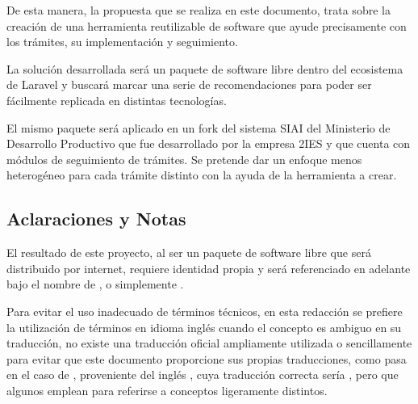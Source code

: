De esta manera, la propuesta que se realiza en este documento, trata sobre la creación de una herramienta reutilizable de software que ayude precisamente con los trámites, su implementación y seguimiento.

La solución desarrollada será un paquete de software libre dentro del ecosistema de Laravel y buscará marcar una serie de recomendaciones para poder ser fácilmente replicada en distintas tecnologías.

El mismo paquete será aplicado en un fork del sistema SIAI del Ministerio de Desarrollo Productivo que fue desarrollado por la empresa 2IES y que cuenta con módulos de seguimiento de trámites. Se pretende dar un enfoque menos heterogéneo para cada trámite distinto con la ayuda de la herramienta a crear.

\subsection{Aclaraciones y Notas}
El resultado de este proyecto, al ser un paquete de software libre que será distribuido por internet, requiere identidad propia y será referenciado en adelante bajo el nombre de , o simplemente .

Para evitar el uso inadecuado de términos técnicos, en esta redacción se prefiere la utilización de
términos en idioma inglés cuando el concepto es ambiguo en su traducción, no
existe una traducción oficial ampliamente utilizada o sencillamente para evitar
que este documento proporcione sus propias traducciones, como pasa en el caso de , proveniente del inglés , cuya traducción correcta sería , pero que algunos emplean para referirse a conceptos ligeramente distintos.